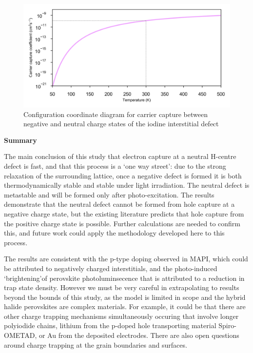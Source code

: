 \begin{figure}[h!]   
\centering
  \includegraphics[width=1.0\columnwidth]{figures/ch6/carrier_capture_rate.png}
  \caption[Rate of electron capture at the ]{Configuration coordinate diagram for carrier capture between negative and neutral charge states of the iodine interstitial defect}
\label{carrier_capture_rate}
\end{figure}




\textbf{Summary}

The main conclusion of this study that electron capture at a neutral H-centre defect is fast, and that this process is a `one way street': due to the strong relaxation of the surrounding lattice, once a negative defect is formed it is both thermodynamically stable and stable under light irradiation.
The neutral defect is metastable and will be formed only after photo-excitation. The results demonstrate that the neutral defect cannot be formed from hole capture at a negative charge state, but the existing literature predicts that hole capture from the positive charge state is possible. Further calculations are needed to confirm this, and future work could apply the methodology developed here to this process. 

The results are consistent with the p-type doping observed in MAPI, which could be attributed to negatively charged interstitials, and the photo-induced `brightening'of perovskite photoluminsecence that is attributed to a reduction in trap state density.
However we must be very careful in extrapolating to results beyond the bounds of this study,
as the model is limited in scope and the hybrid halide perovskites are complex materials. 
For example, it could be that there are other charge trapping mechanisms simultaneously occuring that involve longer polyiodide chains, lithium from the p-doped hole transporting material Spiro-OMETAD, or Au from the deposited electrodes. There are also open questions around charge trapping at the grain boundaries and surfaces.

